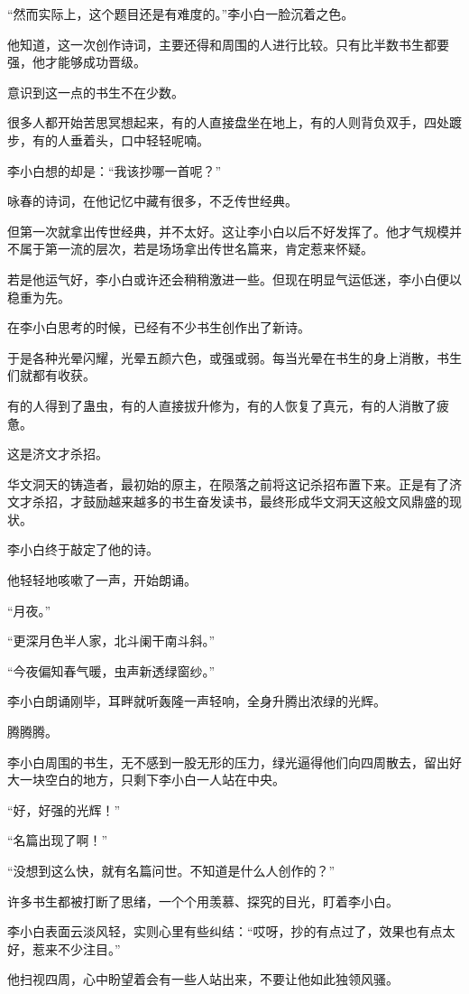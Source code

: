 \begin{this_body}
“然而实际上，这个题目还是有难度的。”李小白一脸沉着之色。

他知道，这一次创作诗词，主要还得和周围的人进行比较。只有比半数书生都要强，他才能够成功晋级。

意识到这一点的书生不在少数。

很多人都开始苦思冥想起来，有的人直接盘坐在地上，有的人则背负双手，四处踱步，有的人垂着头，口中轻轻呢喃。

李小白想的却是：“我该抄哪一首呢？”

咏春的诗词，在他记忆中藏有很多，不乏传世经典。

但第一次就拿出传世经典，并不太好。这让李小白以后不好发挥了。他才气规模并不属于第一流的层次，若是场场拿出传世名篇来，肯定惹来怀疑。

若是他运气好，李小白或许还会稍稍激进一些。但现在明显气运低迷，李小白便以稳重为先。

在李小白思考的时候，已经有不少书生创作出了新诗。

于是各种光晕闪耀，光晕五颜六色，或强或弱。每当光晕在书生的身上消散，书生们就都有收获。

有的人得到了蛊虫，有的人直接拔升修为，有的人恢复了真元，有的人消散了疲惫。

这是济文才杀招。

华文洞天的铸造者，最初始的原主，在陨落之前将这记杀招布置下来。正是有了济文才杀招，才鼓励越来越多的书生奋发读书，最终形成华文洞天这般文风鼎盛的现状。

李小白终于敲定了他的诗。

他轻轻地咳嗽了一声，开始朗诵。

“月夜。”

“更深月色半人家，北斗阑干南斗斜。”

“今夜偏知春气暖，虫声新透绿窗纱。”

李小白朗诵刚毕，耳畔就听轰隆一声轻响，全身升腾出浓绿的光辉。

腾腾腾。

李小白周围的书生，无不感到一股无形的压力，绿光逼得他们向四周散去，留出好大一块空白的地方，只剩下李小白一人站在中央。

“好，好强的光辉！”

“名篇出现了啊！”

“没想到这么快，就有名篇问世。不知道是什么人创作的？”

许多书生都被打断了思绪，一个个用羡慕、探究的目光，盯着李小白。

李小白表面云淡风轻，实则心里有些纠结：“哎呀，抄的有点过了，效果也有点太好，惹来不少注目。”

他扫视四周，心中盼望着会有一些人站出来，不要让他如此独领风骚。


\end{this_body}
